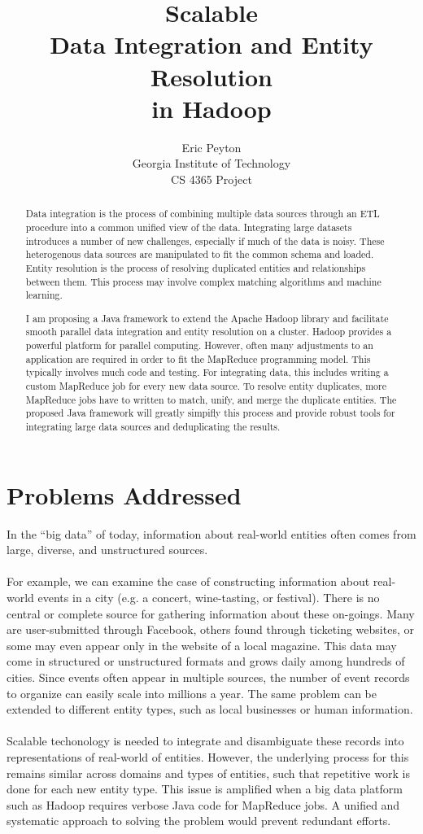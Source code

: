\documentclass[12pt]{article}
\title{Scalable\\ Data Integration and Entity Resolution\\in Hadoop}
\author{Eric Peyton\\
\small Georgia Institute of Technology\\
\small CS 4365 Project\\
}
\begin{document}
\maketitle

\begin{abstract}
Data integration is the process of combining multiple data sources through an ETL procedure into a common unified view of the data. Integrating large datasets introduces a number of new challenges, especially if much of the data is noisy. These heterogenous data sources are manipulated to fit the common schema and loaded. Entity resolution is the process of resolving duplicated entities and relationships between them. This process may involve complex matching algorithms and machine learning.

I am proposing a Java framework to extend the Apache Hadoop library and facilitate smooth parallel data integration and entity resolution on a cluster. Hadoop provides a powerful platform for parallel computing. However, often many adjustments to an application are required in order to fit the MapReduce programming model. This typically involves much code and testing. For integrating data, this includes writing a custom MapReduce job for every new data source. To resolve entity duplicates, more MapReduce jobs have to written to match, unify, and merge the duplicate entities. The proposed Java framework will greatly simpifly this process and provide robust tools for integrating large data sources and deduplicating the results.
\end{abstract}
\section{Problems Addressed}
In the ``big data'' of today, information about real-world entities often comes from large, diverse, and unstructured sources. \\\\
For example,  we can examine the case of constructing information about real-world events in a city (e.g. a concert, wine-tasting, or festival). 
There is no central or complete source for gathering information about these on-goings. Many are user-submitted through Facebook, others found through ticketing websites, or some may even appear only in the website of a local magazine. 
This data may come in structured or unstructured formats and grows daily among hundreds of cities. 
Since events often appear in multiple sources, the number of event records to organize can easily scale into millions a year. 
The same problem can be extended to different entity types, such as local businesses or human information.\\\\
Scalable techonology is needed to integrate and disambiguate these records into representations of real-world of entities. However, the underlying process for this remains similar across domains and types of entities, such that repetitive work is done for each new entity type. This issue is amplified when a big data platform such as Hadoop requires verbose Java code for MapReduce jobs. A unified and systematic approach to solving the problem would prevent redundant efforts.
\end{document}
